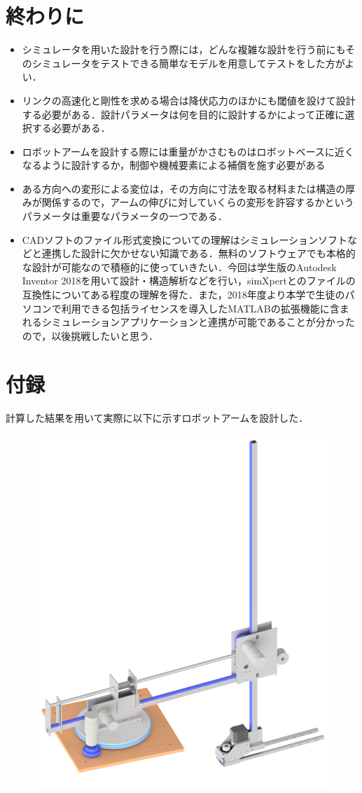 \documentclass[10pt,b5paper,papersize,dvipdfmx]{jsbook}
\begin{document}
\section{終わりに}
\begin{itemize}
\item シミュレータを用いた設計を行う際には，どんな複雑な設計を行う前にもそのシミュレータをテストできる簡単なモデルを用意してテストをした方がよい．
\item リンクの高速化と剛性を求める場合は降伏応力のほかにも閾値を設けて設計する必要がある．設計パラメータは何を目的に設計するかによって正確に選択する必要がある．
\item ロボットアームを設計する際には重量がかさむものはロボットベースに近くなるように設計するか，制御や機械要素による補償を施す必要がある
\item ある方向への変形による変位は，その方向に寸法を取る材料または構造の厚みが関係するので，アームの伸びに対していくらの変形を許容するかというパラメータは重要なパラメータの一つである．
\item CADソフトのファイル形式変換についての理解はシミュレーションソフトなどと連携した設計に欠かせない知識である．無料のソフトウェアでも本格的な設計が可能なので積極的に使っていきたい．今回は学生版のAutodesk Inventor 2018を用いて設計・構造解析などを行い，simXpertとのファイルの互換性についてある程度の理解を得た．また，2018年度より本学で生徒のパソコンで利用できる包括ライセンスを導入したMATLABの拡張機能に含まれるシミュレーションアプリケーションと連携が可能であることが分かったので，以後挑戦したいと思う．
\end{itemize}

\section{付録}
計算した結果を用いて実際に以下に示すロボットアームを設計した．
\begin{figure}[htb]
  \centering
  \includegraphics[width=.75\textwidth]{img/robot33.png}
\end{figure}
\end{document}
